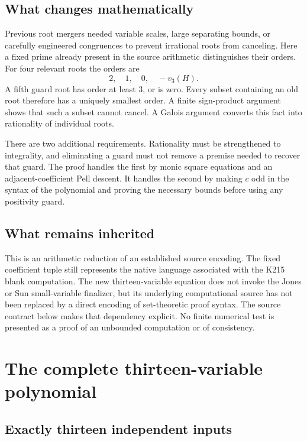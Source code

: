 \documentclass[11pt]{article}
\theoremstyle{definition}
\theoremstyle{remark}
\newcommand{\vp}{v_3}
\begin{document}
\subsection{What changes mathematically}

Previous root mergers needed variable scales, large separating bounds,
or carefully engineered congruences to prevent irrational roots from
canceling. Here a fixed prime already present in the source arithmetic
distinguishes their orders. For four relevant roots the orders are
\[
 2,\quad1,\quad0,\quad-\vp(H).
\]
A fifth guard root has order at least \(3\), or is zero. Every subset
containing an old root therefore has a uniquely smallest order.
A finite sign-product argument shows that such a subset cannot cancel.
A Galois argument converts this fact into rationality of individual
roots.

There are two additional requirements. Rationality must be strengthened
to integrality, and eliminating a guard must not remove a premise needed
to recover that guard. The proof handles the first by monic square
equations and an adjacent-coefficient Pell descent. It handles the second
by making \(c\) odd in the syntax of the polynomial and proving the
necessary bounds before using any positivity guard.

\subsection{What remains inherited}

This is an arithmetic reduction of an established source encoding. The
fixed coefficient tuple still represents the native language associated
with the K215 blank computation. The new thirteen-variable equation
does not invoke the Jones or Sun small-variable finalizer, but its
underlying computational source has not been replaced by a direct
encoding of set-theoretic proof syntax. The source contract below makes
that dependency explicit. No finite numerical test is presented as a
proof of an unbounded computation or of consistency.

\section{The complete thirteen-variable polynomial}
\label{sec:polynomial}

\subsection{Exactly thirteen independent inputs}
\end{document}
